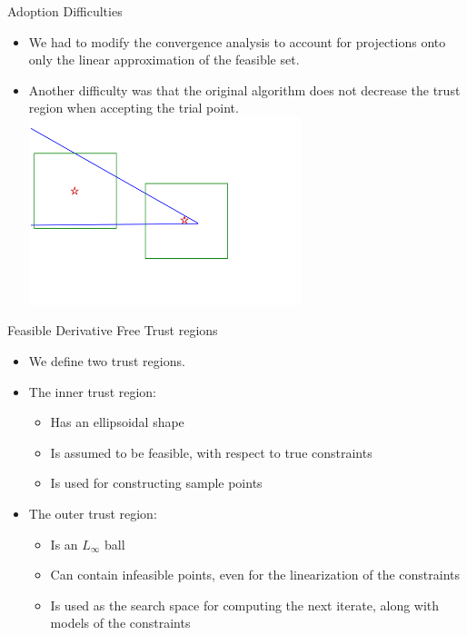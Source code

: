 \documentclass{beamer}
\begin{document}
\begin{frame}{Adoption Difficulties}

\begin{itemize}
    \item We had to modify the convergence analysis to account for projections onto only the linear approximation of the feasible set.
    \item Another difficulty was that the original algorithm does not decrease the trust region when accepting the trial point.
    \includegraphics[width=300px]{images/decrease_required.png}
\end{itemize}


\end{frame}


\begin{frame}{Feasible Derivative Free Trust regions}
    \begin{itemize}
        \item We define two trust regions.
        \item The inner trust region:
            \begin{itemize}
                \item Has an ellipsoidal shape
                \item Is assumed to be feasible, with respect to true constraints
                \item Is used for constructing sample points
            \end{itemize}
        \item The outer trust region:
            \begin{itemize}
                \item Is an $L_{\infty}$ ball
                \item Can contain infeasible points, even for the linearization of the constraints
                \item Is used as the search space for computing the next iterate, along with models of the constraints
            \end{itemize}
    \end{itemize}
\end{frame}
\end{document}
